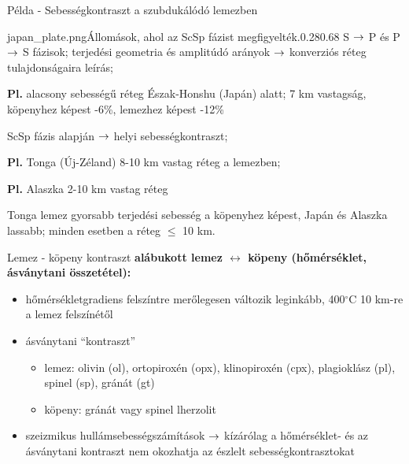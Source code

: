 \documentclass{beamer}
\begin{document}
\begin{frame}{Példa - Sebességkontraszt a szubdukálódó lemezben}
    \begin{figp}{japan_plate.png}{Állomások, ahol az ScSp fázist megfigyelték.}{0.28}{0.68}
        S $\rightarrow$ P és P $\rightarrow$ S fázisok; terjedési geometria és amplitúdó arányok $\rightarrow$ konverziós réteg tulajdonságaira leírás;
        \vspace{5pt}
        
        \textbf{Pl.} alacsony sebességű réteg Észak-Honshu (Japán) alatt; 7 km vastagság, köpenyhez képest -6\%, lemezhez képest -12\%
        \vspace{20pt}
        
        ScSp fázis alapján $\rightarrow$ helyi sebességkontraszt;
        \vspace{5pt}
        
        \textbf{Pl.} Tonga (Új-Zéland) 8-10 km vastag réteg a lemezben;
        
        \textbf{Pl.} Alaszka 2-10 km vastag réteg
        \vspace{10pt}
        
        Tonga lemez gyorsabb terjedési sebesség a köpenyhez képest, Japán és Alaszka lassabb; minden esetben a réteg $\le$ 10 km.
    \end{figp}
\end{frame}


\begin{frame}{Lemez - köpeny kontraszt}
    \textbf{alábukott lemez $\leftrightarrow$ köpeny (hőmérséklet, ásványtani összetétel):}
    \begin{itemize}
        \item hőmérsékletgradiens felszíntre merőlegesen változik leginkább, 400$^\circ$C 10 km-re a lemez felszínétől
        \item ásványtani ``kontraszt''
        \begin{itemize}
            \item lemez: olivin (ol), ortopiroxén (opx), klinopiroxén (cpx), plagioklász (pl), spinel (sp), gránát (gt)
            \item köpeny: gránát vagy spinel lherzolit
        \end{itemize}
        \item szeizmikus hullámsebességszámítások $\rightarrow$ kízárólag a hőmérséklet- és az ásványtani kontraszt nem okozhatja az észlelt sebességkontrasztokat
    \end{itemize}
\end{frame}
\end{document}
